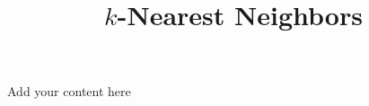 \title{$k$-Nearest Neighbors}
\label{chp:k-nearest-neighbors}
\author{}
\institute{}
\maketitle



Add your content here




